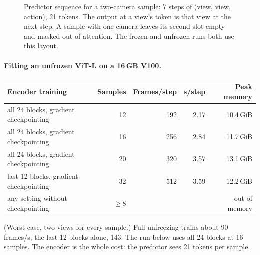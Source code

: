 \documentclass[10pt]{article}
\begin{document}
\begin{figure}[H]
\centering
{}
\caption{Predictor sequence for a two-camera sample: 7 steps of (view, view, action), 21
tokens. The output at a view's token is that view at the next step. A sample with one camera leaves its second slot empty and masked out of attention.
The frozen and unfrozen runs both use this layout.}
\label{fig:tokens}
\end{figure}

\paragraph{Fitting an unfrozen ViT-L on a 16\,GB V100.}
\begin{center}\small
\begin{tabular}{@{}lrrrr@{}}
\toprule
Encoder training & Samples & Frames/step & s/step & Peak memory \\
\midrule
all 24 blocks, gradient checkpointing & 12 & 192 & 2.17 & 10.4\,GiB \\
all 24 blocks, gradient checkpointing & 16 & 256 & 2.84 & 11.7\,GiB \\
all 24 blocks, gradient checkpointing & 20 & 320 & 3.57 & 13.1\,GiB \\
last 12 blocks, gradient checkpointing & 32 & 512 & 3.59 & 12.2\,GiB \\
any setting without checkpointing & $\geq 8$ & & & out of memory \\
\bottomrule
\end{tabular}
\end{center}
(Worst case, two views for every sample.) Full unfreezing trains about 90 frames/s; the last
12 blocks alone, 143. The run below uses all 24 blocks at 16 samples. The encoder is the whole
cost: the predictor sees 21 tokens per sample.
\end{document}
